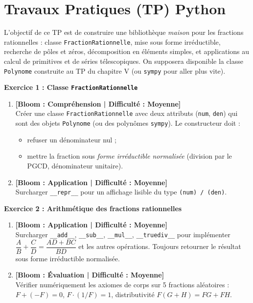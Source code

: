 \documentclass[12pt,a4paper]{report}
\theoremstyle{definition}
\theoremstyle{remark}
\begin{document}
\section*{Travaux Pratiques (TP) Python}

\vspace{0.3cm}
\noindent L'objectif de ce TP est de construire une bibliothèque \emph{maison} pour les fractions rationnelles : classe \texttt{FractionRationnelle}, mise sous forme irréductible, recherche de pôles et zéros, décomposition en éléments simples, et applications au calcul de primitives et de séries télescopiques. On supposera disponible la classe \texttt{Polynome} construite au TP du chapitre V (ou \texttt{sympy} pour aller plus vite).

\vspace{0.3cm}

\noindent\textbf{Exercice 1 : Classe \texttt{FractionRationnelle}}
\begin{enumerate}
    \item \textbf{[Bloom : Compréhension | Difficulté : Moyenne]} \\
    Créer une classe \texttt{FractionRationnelle} avec deux attributs (\texttt{num}, \texttt{den}) qui sont des objets \texttt{Polynome} (ou des polynômes \texttt{sympy}). Le constructeur doit :
    \begin{itemize}
        \item refuser un dénominateur nul ;
        \item mettre la fraction sous \emph{forme irréductible normalisée} (division par le PGCD, dénominateur unitaire).
    \end{itemize}
    \item \textbf{[Bloom : Application | Difficulté : Moyenne]} \\
    Surcharger \texttt{\_\_repr\_\_} pour un affichage lisible du type \texttt{(num) / (den)}.
\end{enumerate}

\vspace{0.3cm}

\noindent\textbf{Exercice 2 : Arithmétique des fractions rationnelles}
\begin{enumerate}
    \item \textbf{[Bloom : Application | Difficulté : Moyenne]} \\
    Surcharger \texttt{\_\_add\_\_}, \texttt{\_\_sub\_\_}, \texttt{\_\_mul\_\_}, \texttt{\_\_truediv\_\_} pour implémenter $\dfrac{A}{B} + \dfrac{C}{D} = \dfrac{AD + BC}{BD}$ et les autres opérations. Toujours retourner le résultat sous forme irréductible normalisée.
    \item \textbf{[Bloom : Évaluation | Difficulté : Moyenne]} \\
    Vérifier numériquement les axiomes de corps sur 5 fractions aléatoires : $F + (-F) = 0$, $F \cdot (1/F) = 1$, distributivité $F(G + H) = FG + FH$.
\end{enumerate}
\end{document}
